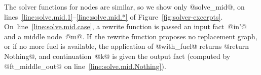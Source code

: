 \documentclass[blockstyle,preprint,natbib,nocopyrightspace]{sigplanconf}
\newcommand\lineref[1]{line~\ref{line:#1}}
\newcommand\linerangeref[2]{\mbox{lines~\ref{line:#1}--\ref{line:#2}}}
\newcommand\figref[1]{Figure~\ref{fig:#1}}
\begin{document}
% 
% 

The solver functions for nodes
are similar, so we show only
@solve_mid@, on
\linerangeref{solve.mid.1}{solve.mid.*} of \figref{solver-excerpts}.
On~\lineref{solve.mid.case}, a rewrite function is passed an
input fact~@in'@ and a middle node~@m@.
If~the rewrite function proposes no replacement graph, 
or if no more fuel is available, the application of @with_fuel@
returns @return Nothing@, and continuation~@k@ is given the output fact
(computed by @ft_middle_out@ on \lineref{solve.mid.Nothing}).
\end{document}
